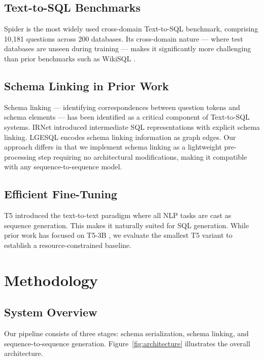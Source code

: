 \documentclass[conference]{IEEEtran}
\begin{document}
\subsection{Text-to-SQL Benchmarks}
Spider \cite{yu2018spider} is the most widely used cross-domain Text-to-SQL benchmark, comprising 10,181 questions across 200 databases. Its cross-domain nature — where test databases are unseen during training — makes it significantly more challenging than prior benchmarks such as WikiSQL \cite{zhong2017seq2sql}.

\subsection{Schema Linking in Prior Work}
Schema linking — identifying correspondences between question tokens and schema elements — has been identified as a critical component of Text-to-SQL systems. IRNet \cite{guo2019irnet} introduced intermediate SQL representations with explicit schema linking. LGESQL \cite{cao2021lgesql} encodes schema linking information as graph edges. Our approach differs in that we implement schema linking as a lightweight pre-processing step requiring no architectural modifications, making it compatible with any sequence-to-sequence model.

\subsection{Efficient Fine-Tuning}
T5 \cite{raffel2020t5} introduced the text-to-text paradigm where all NLP tasks are cast as sequence generation. This makes it naturally suited for SQL generation. While prior work has focused on T5-3B \cite{shaw2021compositional}, we evaluate the smallest T5 variant to establish a resource-constrained baseline.

\section{Methodology}

\subsection{System Overview}

Our pipeline consists of three stages: schema serialization, schema linking, and sequence-to-sequence generation. Figure~\ref{fig:architecture} illustrates the overall architecture.
\end{document}
